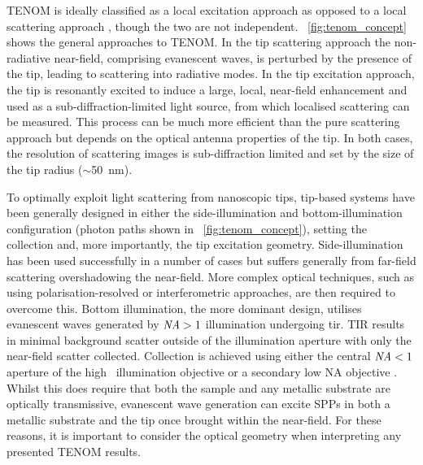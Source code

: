 \documentclass{article}
\begin{document}
TENOM is ideally classified as a local excitation approach as opposed to a local scattering approach \cite{novotny2006}, though the two are not independent. \figurename~\ref{fig:tenom_concept} shows the general approaches to TENOM. In the tip scattering approach the non-radiative near-field, comprising evanescent waves, is perturbed by the presence of the tip, leading to scattering into radiative modes. In the tip excitation approach, the tip is resonantly excited to induce a large, local, near-field enhancement and used as a sub-diffraction-limited light source, from which  localised scattering can be measured. This process can be much more efficient than the pure scattering approach but depends on the optical antenna properties of the tip. In both cases, the resolution of scattering images is sub-diffraction limited and set by the size of the tip radius ($\sim$\SI{50}{nm}).


To optimally exploit light scattering from nanoscopic tips, tip-based systems have been generally designed in either the side-illumination and bottom-illumination configuration (photon paths shown in \figurename~\ref{fig:tenom_concept}), setting the collection and, more importantly, the tip excitation geometry. Side-illumination has been used successfully in a number of cases \cite{mehtani2006, steidtner2007, zhang2013, wickramasinghe2014} but suffers generally from far-field scattering overshadowing the near-field. More complex optical techniques, such as using polarisation-resolved or interferometric approaches, are then required to overcome this. %
Bottom illumination, the more dominant design, utilises evanescent waves generated by $\mathit{NA}>1$ illumination undergoing \gls{tir}. TIR results in minimal background scatter outside of the illumination aperture with only the near-field scatter collected. Collection is achieved using either the central $\mathit{NA}<1$ aperture of the high \NA\ illumination objective \cite{hayazawa2001, yeo2006, yeo2007, zhang2013experimental, mino2014, kumar2014} or a secondary low NA objective \cite{hayazawa2007, taguchi2009, uetsuki2012}. Whilst this does require that both the sample and any metallic substrate are optically transmissive, evanescent wave generation can excite SPPs in both a metallic substrate and the tip once brought within the near-field. For these reasons, it is important to consider the optical geometry when interpreting any presented TENOM results.
\end{document}
